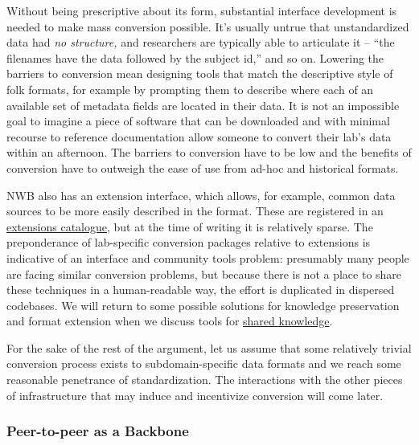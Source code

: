 \documentclass[10pt]{article}
\begin{document}
\begin{multicols}{2}
Without being prescriptive about its form, substantial interface
development is needed to make mass conversion possible. It's usually
untrue that unstandardized data had \emph{no structure,} and researchers
are typically able to articulate it -- ``the filenames have the data
followed by the subject id,'' and so on. Lowering the barriers to
conversion mean designing tools that match the descriptive style of folk
formats, for example by prompting them to describe where each of an
available set of metadata fields are located in their data. It is not an
impossible goal to imagine a piece of software that can be downloaded
and with minimal recourse to reference documentation allow someone to
convert their lab's data within an afternoon. The barriers to conversion
have to be low and the benefits of conversion have to outweigh the ease
of use from ad-hoc and historical formats.

NWB also has an extension interface, which allows, for example, common
data sources to be more easily described in the format. These are
registered in an \href{https://nwb-extensions.github.io/}{extensions
catalogue}, but at the time of writing it is relatively sparse. The
preponderance of lab-specific conversion packages relative to extensions
is indicative of an interface and community tools problem: presumably
many people are facing similar conversion problems, but because there is
not a place to share these techniques in a human-readable way, the
effort is duplicated in dispersed codebases. We will return to some
possible solutions for knowledge preservation and format extension when
we discuss tools for \protect\hyperlink{shared-knowledge}{shared
knowledge}.

For the sake of the rest of the argument, let us assume that some
relatively trivial conversion process exists to subdomain-specific data
formats and we reach some reasonable penetrance of standardization. The
interactions with the other pieces of infrastructure that may induce and
incentivize conversion will come later.

\hypertarget{peer-to-peer-as-a-backbone}{%
\subsubsection{Peer-to-peer as a
Backbone}\label{peer-to-peer-as-a-backbone}}


\end{multicols}
\end{document}
